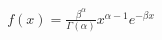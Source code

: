 \documentclass[preview]{standalone}
\begin{document}
\begin{align*}
f(x) = \frac{\beta^\alpha}{\Gamma(\alpha)} x^{\alpha-1} e^{-\beta x}
\end{align*}
\end{document}
